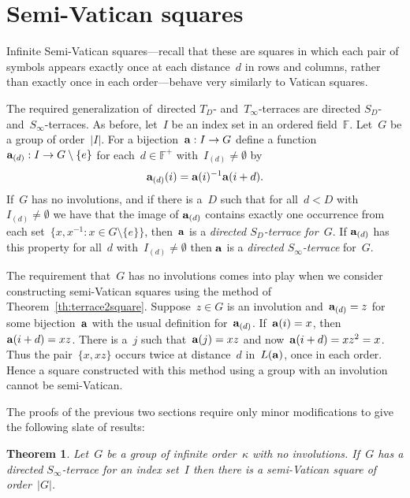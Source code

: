 \documentclass[12pt,a4paper]{article}
\newtheorem{thm}{Theorem}[section]
\newcommand{\F}{\mathbb{F}}
\begin{document}
\section{Semi-Vatican squares}\label{sec:semivat}

Infinite Semi-Vatican squares---recall that these are squares in which each pair of symbols appears exactly once at each distance~$d$ in rows and columns, rather than exactly once in each order---behave very similarly to Vatican squares.  

The required generalization of~directed $T_{D}$- and~$T_{\infty}$-terraces are directed $S_{D}$- and~$S_{\infty}$-terraces.  As before, let~$I$ be an index set in an ordered field~$\F$.  Let~$G$ be a group of order~$|I|$.  For a bijection~${\bf a}: I \rightarrow G$ define a function~${\bf a}_{(d)}: I \rightarrow G \setminus \{ e \}$ for each~$d \in \F^+$ with~$I_{(d)} \neq \emptyset$ by
$${\bf a}_{(d)}(i) = {\bf a}(i)^{-1}{\bf a}(i+d).$$
If~$G$ has no involutions, and if there is a~$D$ such that for all~$d < D$ with~$I_{(d)} \neq \emptyset$ we have that the image of ${\bf a}_{(d)}$ contains exactly one occurrence from each set~$\{ x,x^{-1} : x \in G\setminus \{e\} \}$, then~${\bf a}$ is a {\em directed $S_D$-terrace for~$G$}.  If ${\bf a}_{(d)}$ has this property for all~$d$ with~$I_{(d)} \neq \emptyset$ then ${\bf a}$ is  a {\em directed $S_{\infty}$-terrace} for~$G$.

The requirement that~$G$ has no involutions comes into play when we consider constructing semi-Vatican squares using the method of Theorem~\ref{th:terrace2square}.  Suppose~$z \in G$ is an involution and~${\bf a}_{(d)} = z$ for some bijection~${\bf a}$ with the usual definition for~${\bf a}_{(d)}$.  If~${\bf a}(i) = x$, then ${\bf a}(i+d) = xz$.  There is a~$j$ such that~${\bf a}(j) = xz$ and now~${\bf a}(i+d) = xz^2 = x$.  Thus the pair~$\{ x, xz \}$ occurs twice at distance~$d$ in~$L({\bf a})$, once in each order.  Hence a square constructed with this method using a group with an involution cannot be semi-Vatican.



The proofs of the previous two sections require only minor modifications to give the following slate of results:

\begin{thm}\label{th:semi_terrace2square}
Let~$G$ be a group of infinite order~$\kappa$ with no involutions.  If~$G$ has a directed $S_{\infty}$-terrace for an index set~$I$ then there is a semi-Vatican square of order~$|G|$.
\end{thm}
\end{document}
